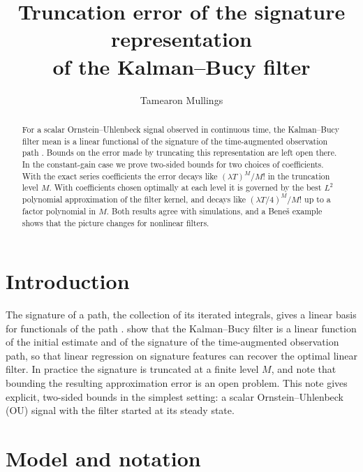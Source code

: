 \documentclass[11pt]{article}
\title{Truncation error of the signature representation\\ of the Kalman--Bucy filter}
\author{Tamearon Mullings}
\date{}
\theoremstyle{remark}
\begin{document}
\maketitle

\begin{abstract}
For a scalar Ornstein--Uhlenbeck signal observed in continuous time, the Kalman--Bucy filter
mean is a linear functional of the signature of the time-augmented observation path
\citep{cohen2023}. Bounds on the error made by truncating this representation are left open
there. In the constant-gain case we prove two-sided bounds for two choices of coefficients.
With the exact series coefficients the error decays like $(\lambda T)^M/M!$ in the truncation
level $M$. With coefficients chosen optimally at each level it is governed by the best $L^2$
polynomial approximation of the filter kernel, and decays like $(\lambda T/4)^M/M!$ up to a
factor polynomial in $M$. Both results agree with simulations, and a Bene\v{s} example
shows that the picture changes for nonlinear filters.
\end{abstract}

\section{Introduction}

The signature of a path, the collection of its iterated integrals, gives a linear basis for
functionals of the path \citep{lyons1998}. \citet{cohen2023} show that the Kalman--Bucy filter
\citep{kalman1961} is a linear function of the initial estimate and of the signature of the
time-augmented observation path, so that linear regression on signature features can recover
the optimal linear filter. In practice the signature is truncated at a finite level $M$, and
\citet[App.~H.3]{cohen2023} note that bounding the resulting approximation error is an open
problem. This note gives explicit, two-sided bounds in the simplest setting: a scalar
Ornstein--Uhlenbeck (OU) signal with the filter started at its steady state.

\section{Model and notation}
\end{document}
